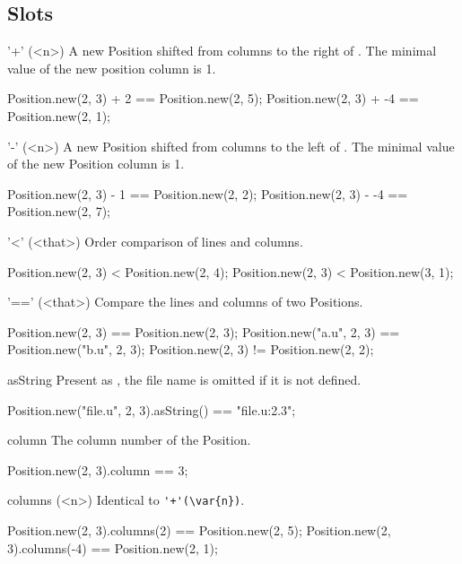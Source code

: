 \subsection{Slots}

\begin{urbiscriptapi}
\item['+'](<n>)%
  A new Position shifted from  columns to the right of \this.  The
  minimal value of the new position column is 1.
\begin{urbiassert}
Position.new(2, 3) + 2  == Position.new(2, 5);
Position.new(2, 3) + -4 == Position.new(2, 1);
\end{urbiassert}


\item['-'](<n>)%
  A new Position shifted from  columns to the left of \this.  The
  minimal value of the new Position column is 1.
\begin{urbiassert}
Position.new(2, 3) - 1  == Position.new(2, 2);
Position.new(2, 3) - -4 == Position.new(2, 7);
\end{urbiassert}


\item['<'](<that>)%
  Order comparison of lines and columns.
\begin{urbiassert}
Position.new(2, 3) < Position.new(2, 4);
Position.new(2, 3) < Position.new(3, 1);
\end{urbiassert}


\item['=='](<that>)%
  Compare the lines and columns of two Positions.
\begin{urbiassert}
Position.new(2, 3)        == Position.new(2, 3);
Position.new("a.u", 2, 3) == Position.new("b.u", 2, 3);
Position.new(2, 3)        != Position.new(2, 2);
\end{urbiassert}


\item[asString]
  Present as , the file name is
  omitted if it is not defined.
\begin{urbiassert}
Position.new("file.u", 2, 3).asString() == "file.u:2.3";
\end{urbiassert}


\item[column]
  The column number of the Position.
\begin{urbiassert}
Position.new(2, 3).column == 3;
\end{urbiassert}


\item[columns](<n>)%
  Identical to \lstinline|'+'(\var{n})|.
\begin{urbiassert}
Position.new(2, 3).columns(2)  == Position.new(2, 5);
Position.new(2, 3).columns(-4) == Position.new(2, 1);
\end{urbiassert}



\end{urbiscriptapi}
